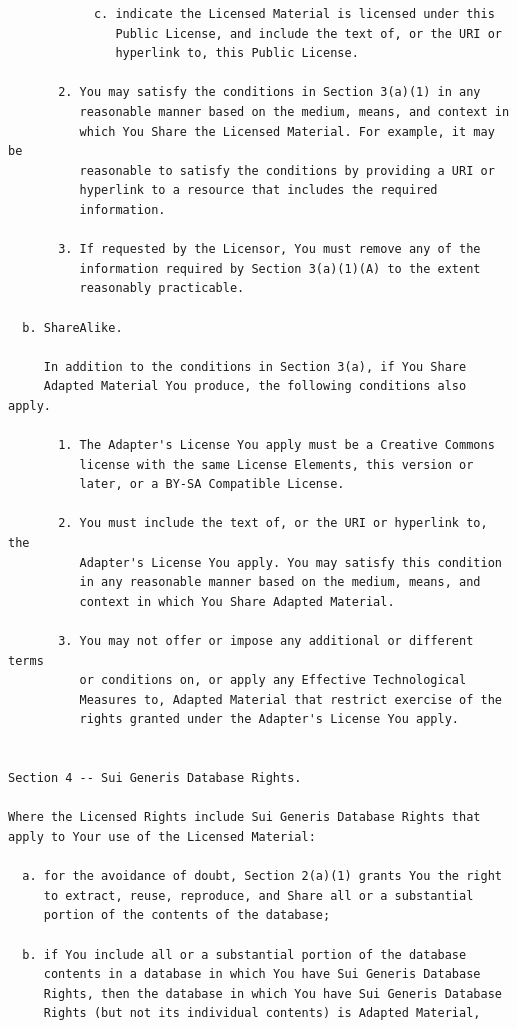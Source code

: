 \documentclass[12pt,spanish,]{scrartcl}
\begin{document}
\begin{verbatim}
            c. indicate the Licensed Material is licensed under this
               Public License, and include the text of, or the URI or
               hyperlink to, this Public License.

       2. You may satisfy the conditions in Section 3(a)(1) in any
          reasonable manner based on the medium, means, and context in
          which You Share the Licensed Material. For example, it may be
          reasonable to satisfy the conditions by providing a URI or
          hyperlink to a resource that includes the required
          information.

       3. If requested by the Licensor, You must remove any of the
          information required by Section 3(a)(1)(A) to the extent
          reasonably practicable.

  b. ShareAlike.

     In addition to the conditions in Section 3(a), if You Share
     Adapted Material You produce, the following conditions also apply.

       1. The Adapter's License You apply must be a Creative Commons
          license with the same License Elements, this version or
          later, or a BY-SA Compatible License.

       2. You must include the text of, or the URI or hyperlink to, the
          Adapter's License You apply. You may satisfy this condition
          in any reasonable manner based on the medium, means, and
          context in which You Share Adapted Material.

       3. You may not offer or impose any additional or different terms
          or conditions on, or apply any Effective Technological
          Measures to, Adapted Material that restrict exercise of the
          rights granted under the Adapter's License You apply.


Section 4 -- Sui Generis Database Rights.

Where the Licensed Rights include Sui Generis Database Rights that
apply to Your use of the Licensed Material:

  a. for the avoidance of doubt, Section 2(a)(1) grants You the right
     to extract, reuse, reproduce, and Share all or a substantial
     portion of the contents of the database;

  b. if You include all or a substantial portion of the database
     contents in a database in which You have Sui Generis Database
     Rights, then the database in which You have Sui Generis Database
     Rights (but not its individual contents) is Adapted Material,


\end{verbatim}
\end{document}

